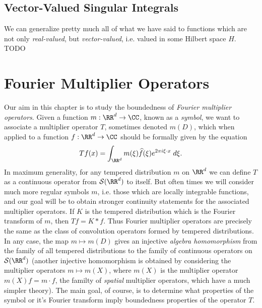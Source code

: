 \section{Vector-Valued Singular Integrals}

We can generalize pretty much all of what we have said to functions which are not only \emph{real-valued}, but \emph{vector-valued}, i.e. valued in some Hilbert space $H$. TODO



















\chapter{Fourier Multiplier Operators}

Our aim in this chapter is to study the boundedness of \emph{Fourier multiplier operators}. Given a function $m: \RR^d \to \CC$, known as a \emph{symbol}, we want to associate a multiplier operator $T$, sometimes denoted $m(D)$, which when applied to a function $f: \RR^d \to \CC$ should be formally given by the equation
%
\[ Tf(x) = \int_{\RR^d} m(\xi) \widehat{f}(\xi) e^{2 \pi i \xi \cdot x}\; d\xi. \]
%
In maximum generality, for any tempered distribution $m$ on $\RR^d$ we can define $T$ as a continuous operator from $\mathcal{S}(\RR^d)$ to itself. But often times we will consider much more regular symbols $m$, i.e. those which are locally integrable functions, and our goal will be to obtain stronger continuity statements for the associated multiplier operators. If $K$ is the tempered distribution which is the Fourier transform of $m$, then $Tf = K * f$. Thus Fourier multiplier operators are precisely the same as the class of convolution operators formed by tempered distributions. In any case, the map $m \mapsto m(D)$ gives an injective \emph{algebra homomorphism} from the family of all tempered distributions to the family of continuous operators on $\mathcal{S}(\RR^d)$ (another injective homomorphism is obtained by considering the multiplier operators $m \mapsto m(X)$, where $m(X)$ is the multiplier operator $m(X) f = m \cdot f$, the familty of \emph{spatial} multiplier operators, which have a much simpler theory). The main goal, of course, is to determine what properties of the symbol or it's Fourier transform imply boundedness properties of the operator $T$.

